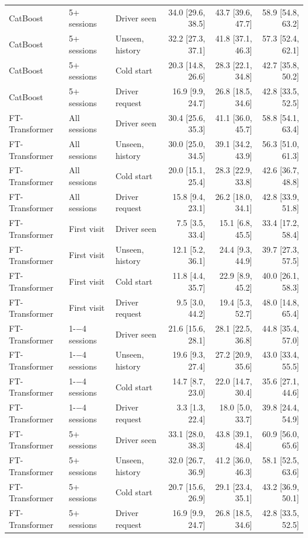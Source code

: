 {\begin{longtable}{lllrrr}
CatBoost & 5+ sessions & Driver seen & 34.0 [29.6, 38.5] & 43.7 [39.6, 47.7] & 58.9 [54.8, 63.2] \\
CatBoost & 5+ sessions & Unseen, history & 32.2 [27.3, 37.1] & 41.8 [37.1, 46.3] & 57.3 [52.4, 62.1] \\
CatBoost & 5+ sessions & Cold start & 20.3 [14.8, 26.6] & 28.3 [22.1, 34.8] & 42.7 [35.8, 50.2] \\
CatBoost & 5+ sessions & Driver request & 16.9 [9.9, 24.7] & 26.8 [18.5, 34.6] & 42.8 [33.5, 52.5] \\
FT-Transformer & All sessions & Driver seen & 30.4 [25.6, 35.3] & 41.1 [36.0, 45.7] & 58.8 [54.1, 63.4] \\
FT-Transformer & All sessions & Unseen, history & 30.0 [25.0, 34.5] & 39.1 [34.2, 43.9] & 56.3 [51.0, 61.3] \\
FT-Transformer & All sessions & Cold start & 20.0 [15.1, 25.4] & 28.3 [22.9, 33.8] & 42.6 [36.7, 48.8] \\
FT-Transformer & All sessions & Driver request & 15.8 [9.4, 23.1] & 26.2 [18.0, 34.1] & 42.8 [33.9, 51.8] \\
FT-Transformer & First visit & Driver seen & 7.5 [3.5, 33.4] & 15.1 [6.8, 45.5] & 33.4 [17.2, 58.4] \\
FT-Transformer & First visit & Unseen, history & 12.1 [5.2, 36.1] & 24.4 [9.3, 44.9] & 39.7 [27.3, 57.5] \\
FT-Transformer & First visit & Cold start & 11.8 [4.4, 35.7] & 22.9 [8.9, 45.2] & 40.0 [26.1, 58.3] \\
FT-Transformer & First visit & Driver request & 9.5 [3.0, 44.2] & 19.4 [5.3, 52.7] & 48.0 [14.8, 65.4] \\
FT-Transformer & 1-$-$4 sessions & Driver seen & 21.6 [15.6, 28.1] & 28.1 [22.5, 36.8] & 44.8 [35.4, 57.0] \\
FT-Transformer & 1-$-$4 sessions & Unseen, history & 19.6 [9.3, 27.4] & 27.2 [20.9, 35.6] & 43.0 [33.4, 55.5] \\
FT-Transformer & 1-$-$4 sessions & Cold start & 14.7 [8.7, 23.0] & 22.0 [14.7, 30.4] & 35.6 [27.1, 44.6] \\
FT-Transformer & 1-$-$4 sessions & Driver request & 3.3 [1.3, 22.4] & 18.0 [5.0, 33.7] & 39.8 [24.4, 54.9] \\
FT-Transformer & 5+ sessions & Driver seen & 33.1 [28.0, 38.3] & 43.8 [39.1, 48.4] & 60.9 [56.0, 65.6] \\
FT-Transformer & 5+ sessions & Unseen, history & 32.0 [26.7, 36.9] & 41.2 [36.0, 46.3] & 58.1 [52.5, 63.6] \\
FT-Transformer & 5+ sessions & Cold start & 20.7 [15.6, 26.9] & 29.1 [23.4, 35.1] & 43.2 [36.9, 50.1] \\
FT-Transformer & 5+ sessions & Driver request & 16.9 [9.9, 24.7] & 26.8 [18.5, 34.6] & 42.8 [33.5, 52.5] \\
\end{longtable}}

